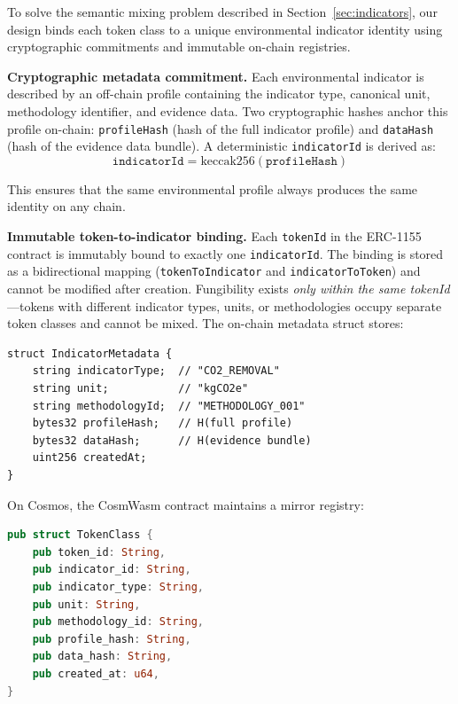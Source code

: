 \documentclass[conference,10pt]{IEEEtran}
\begin{document}
To solve the semantic mixing problem described in Section~\ref{sec:indicators}, our design binds each token class to a unique environmental indicator identity using cryptographic commitments and immutable on-chain registries.

\textbf{Cryptographic metadata commitment.} Each environmental indicator is described by an off-chain profile containing the indicator type, canonical unit, methodology identifier, and evidence data. Two cryptographic hashes anchor this profile on-chain: \texttt{profileHash} (hash of the full indicator profile) and \texttt{dataHash} (hash of the evidence data bundle). A deterministic \texttt{indicatorId} is derived as:
\begin{equation}
\texttt{indicatorId} = \text{keccak256}(\texttt{profileHash})
\end{equation}

This ensures that the same environmental profile always produces the same identity on any chain.

\textbf{Immutable token-to-indicator binding.} Each \texttt{tokenId} in the ERC-1155 contract is immutably bound to exactly one \texttt{indicatorId}. The binding is stored as a bidirectional mapping (\texttt{tokenToIndicator} and \texttt{indicatorToToken}) and cannot be modified after creation. Fungibility exists \textit{only within the same tokenId}---tokens with different indicator types, units, or methodologies occupy separate token classes and cannot be mixed. The on-chain metadata struct stores:

\begin{lstlisting}[caption={IndicatorMetadata (Solidity, EVM)}, label=lst:metadata, language=Solidity]
struct IndicatorMetadata {
    string indicatorType;  // "CO2_REMOVAL"
    string unit;           // "kgCO2e"
    string methodologyId;  // "METHODOLOGY_001"
    bytes32 profileHash;   // H(full profile)
    bytes32 dataHash;      // H(evidence bundle)
    uint256 createdAt;
}
\end{lstlisting}

On Cosmos, the CosmWasm contract maintains a mirror registry:

\begin{lstlisting}[caption={TokenClass (Rust, CosmWasm)}, label=lst:tokenclass, language=Rust]
pub struct TokenClass {
    pub token_id: String,
    pub indicator_id: String,
    pub indicator_type: String,
    pub unit: String,
    pub methodology_id: String,
    pub profile_hash: String,
    pub data_hash: String,
    pub created_at: u64,
}
\end{lstlisting}
\end{document}
